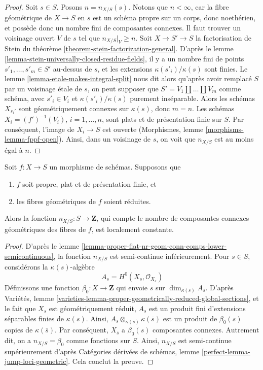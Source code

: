 \begin{proof}
Soit $s \in S$. Posons $n = n_{X/S}(s)$. Notons que $n < \infty$, car la fibre
géométrique de $X \to S$ en $s$ est un schéma propre sur un corps, donc noethérien,
et possède donc un nombre fini de composantes connexes. Il faut trouver un
voisinage ouvert $V$ de $s$ tel que $n_{X/S}|_V \geq n$.
Soit $X \to S' \to S$ la factorisation de Stein du
théorème \ref{theorem-stein-factorization-general}.
D'après le lemme \ref{lemma-stein-universally-closed-residue-fields},
il y a un nombre fini de points $s'_1, \ldots, s'_m \in S'$ au-dessus de $s$,
et les extensions $\kappa(s'_i)/\kappa(s)$ sont finies.
Le lemme \ref{lemma-etale-makes-integral-split}
nous dit alors qu'après avoir remplacé $S$ par un voisinage \'etale
de $s$, on peut supposer que $S' = V_1 \amalg \ldots \amalg V_m$ comme schéma,
avec $s'_i \in V_i$ et $\kappa(s'_i)/\kappa(s)$ purement inséparable.
Alors les schémas $X_{s_i'}$ sont géométriquement connexes sur
$\kappa(s)$, donc $m = n$. Les schémas
$X_i = (f')^{-1}(V_i)$, $i = 1, \ldots, n$,
sont plats et de présentation finie sur $S$. Par conséquent, l'image de $X_i \to S$
est ouverte (Morphismes, lemme \ref{morphisms-lemma-fppf-open}).
Ainsi, dans un voisinage de $s$, on voit que $n_{X/S}$ est
au moins égal à $n$.
\end{proof}

\begin{lemma}
\label{lemma-proper-flat-geom-red}
Soit $f : X \to S$ un morphisme de schémas. Supposons que
\begin{enumerate}
\item $f$ soit propre, plat et de présentation finie, et
\item les fibres géométriques de $f$ soient réduites.
\end{enumerate}
Alors la fonction $n_{X/S} : S \to \mathbf{Z}$,
qui compte le nombre de composantes connexes géométriques
des fibres de $f$, est localement constante.
\end{lemma}

\begin{proof}
D'après le lemme \ref{lemma-proper-flat-nr-geom-conn-comps-lower-semicontinuous},
la fonction $n_{X/S}$ est semi-continue inférieurement.
Pour $s \in S$, considérons la $\kappa(s)$-algèbre
$$
A_s = H^0(X_s, \mathcal{O}_{X_s})
$$
Définissons une fonction $\beta_0 : X \to \mathbf{Z}$ qui envoie
$s$ sur $\dim_{\kappa(s)} A_s$.
D'après Variétés, lemme
\ref{varieties-lemma-proper-geometrically-reduced-global-sections},
et le fait que $X_s$ est géométriquement réduit,
$A_s$ est un produit fini d'extensions séparables finies de $\kappa(s)$.
Ainsi, $A_s \otimes_{\kappa(s)} \kappa(\overline{s})$ est un produit
de $\beta_0(s)$ copies de $\kappa(\overline{s})$. Par conséquent,
$X_{\overline{s}}$ a $\beta_0(s)$ composantes connexes.
Autrement dit, on a $n_{X/S} = \beta_0$
comme fonctions sur $S$. Ainsi, $n_{X/S}$ est semi-continue supérieurement d'après
Catégories dérivées de schémas, lemme \ref{perfect-lemma-jump-loci-geometric}.
Cela conclut la preuve.
\end{proof}

